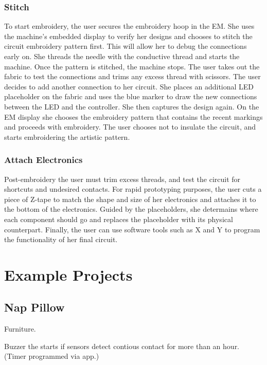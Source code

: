 \documentclass[header.tex]{subfiles}
\begin{document}
\subsubsection{Stitch}
To start embroidery, the user secures the embroidery hoop in the EM. She uses the machine's embedded display to verify her designs and chooses to stitch the circuit embroidery pattern first. This will allow her to debug the connections early on. She threads the needle with the conductive thread and starts the machine. Once the pattern is stitched, the machine stops. The user takes out the fabric to test the connections and trims any excess thread with scissors. The user decides to add another connection to her circuit. She places an additional LED placeholder on the fabric and uses the blue marker to draw the new connections between the LED and the controller. She then captures the design again. On the EM display she chooses the embroidery pattern that contains the recent markings and proceeds with embroidery. The user chooses not to insulate the circuit, and starts embroidering the artistic pattern.

\subsubsection{Attach Electronics}
Post-embroidery the user must trim excess threads, and test the circuit for shortcuts and undesired contacts. For rapid prototyping purposes, the user cuts a piece of Z-tape to match the shape and size of her electronics and attaches it to the bottom of the electronics. Guided by the placeholders, she determains where each component should go and replaces the placeholder with its physical counterpart.  Finally, the user can use software tools such as X and Y to program the functionality of her final circuit.






\section{Example Projects}

\subsection{Nap Pillow}
Furniture.

Buzzer the starts if sensors detect contious contact for more than an hour. (Timer programmed via app.)
\end{document}
